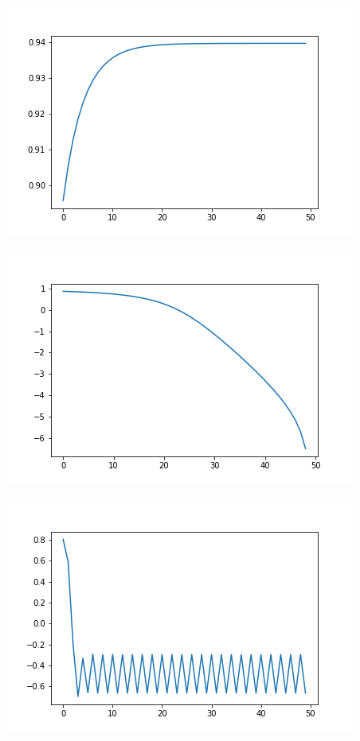 \documentclass[a4paper,12pt]{article}
\begin{document}
\begin{figure}[h!]
\caption{Direction de descente (\autoref{equation:descente})}
\label{fig:tme3_descente_direction}
\begin{subfigure}{.33\textwidth}
	\centering
	\includegraphics[width=\linewidth]{images/tme3/descente_error_0.png}
\end{subfigure}%
\begin{subfigure}{.33\textwidth}
  \centering
	\includegraphics[width=\linewidth]{images/tme3/descente_error_1.png}
\end{subfigure}
\begin{subfigure}{.33\textwidth}
  \centering
	\includegraphics[width=\linewidth]{images/tme3/descente_error_2.png}
\end{subfigure}
\end{figure}
\end{document}

